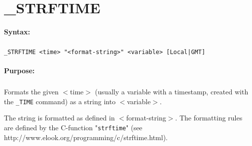 
\newpage
\section{\_STRFTIME}
\label{cmd:_STRFTIME}

\paragraph{Syntax:}
\subparagraph{}
\texttt{\_STRFTIME <time> "<format-string>" <variable> [Local|GMT]}

\paragraph{Purpose:}
\subparagraph{}
Formats the given $<$time$>$ (usually a variable with a timestamp, created with the \texttt{\_TIME} command) as a string into $<$variable$>$. 

The string is formatted as defined in $<$format-string$>$. The formatting rules are defined by the C-function "\texttt{strftime}" (see http://www.elook.org/programming/c/strftime.html).